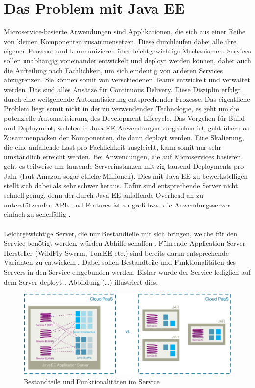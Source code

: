 \section{Das Problem mit Java EE}
Microservice-basierte Anwendungen sind Applikationen, die sich aus einer Reihe von kleinen Komponenten zusammensetzen. Diese durchlaufen dabei alle ihre eigenen Prozesse und kommunizieren über leichtgewichtige Mechanismen. Services sollen unabhängig voneinander entwickelt und deployt werden können, daher auch die Aufteilung nach Fachlichkeit, um sich eindeutig von anderen Services abzugrenzen. Sie können somit von verschiedenen Teams entwickelt und verwaltet werden. Das sind alles Ansätze für Continuous Delivery. Diese Disziplin erfolgt durch eine weitgehende Automatisierung entsprechender Prozesse. Das eigentliche Problem liegt somit nicht in der zu verwendenden Technologie, es geht um die potenzielle Automatisierung des Development Lifecycle. Das Vorgehen für Build und Deployment, welches in Java EE-Anwendungen vorgesehen ist, geht über das Zusammenpacken der Komponenten, die dann deployt werden. Eine Skalierung, die eine anfallende Last pro Fachlichkeit ausgleicht, kann somit nur sehr umständlich erreicht werden. Bei Anwendungen, die auf Microservices basieren, geht es teilweise um tausende Serverinstanzen mit zig tausend Deployments pro Jahr (laut Amazon sogar etliche Millionen). Dies mit Java EE zu bewerkstelligen stellt sich dabei als sehr schwer heraus. Dafür sind entsprechende Server nicht schnell genug, denn der durch Java-EE anfallende Overhead an zu unterstützenden APIs und Features ist zu groß bzw. die Anwendungsserver einfach zu scherfällig \cite{jaxcenter.2016}. \\ \\
Leichtgewichtige Server, die nur Bestandteile mit sich bringen, welche für den Service benötigt werden, würden Abhilfe schaffen \cite{jaxcenter.2016}. Führende Application-Server-Hersteller (WildFly Swarm, TomEE etc.) sind bereits daran entsprechende Varianten zu entwickeln \cite{LarsRowekamp.2016}. Dabei sollen Bestandteile und Funktionalitäten des Servers in den Service eingebunden werden. Bisher wurde der Service lediglich auf dem Server deployt \cite{jaxcenter.2016}. Abbildung (…) illustriert dies.
\begin{figure}[h!]
	\centering
	\includegraphics[width=1.0\linewidth]{images/mp}
	\caption{Bestandteile und Funktionalitäten im Service \cite{jaxcenter.2016}}
	\label{fig:mp}
\end{figure}
